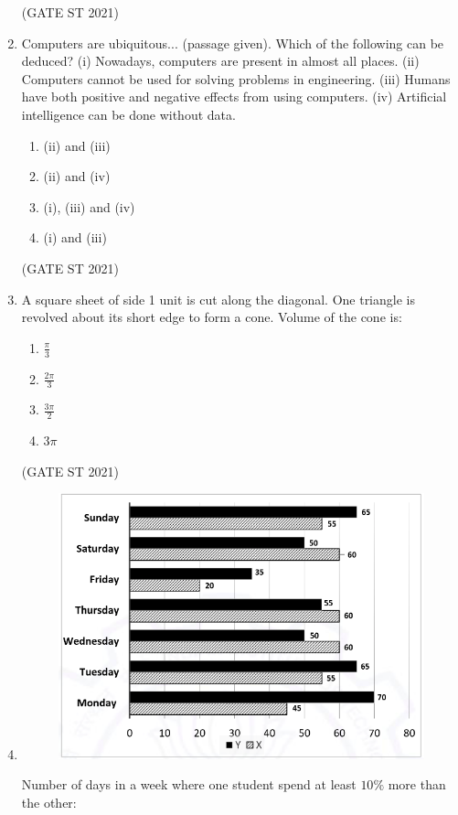 \documentclass[journal,12pt,onecolumn]{IEEEtran}
\theoremstyle{remark}
\begin{document}
\begin{enumerate}
\hfill (GATE ST 2021)\\
\item
Computers are ubiquitous... (passage given).  
Which of the following can be deduced?  
(i) Nowadays, computers are present in almost all places.  
(ii) Computers cannot be used for solving problems in engineering.  
(iii) Humans have both positive and negative effects from using computers.  
(iv) Artificial intelligence can be done without data.

\begin{enumerate}
\item (ii) and (iii)
\item (ii) and (iv)
\item (i), (iii) and (iv)
\item (i) and (iii)
\end{enumerate}

\hfill (GATE ST 2021)\\

\item
A square sheet of side 1 unit is cut along the diagonal.  
One triangle is revolved about its short edge to form a cone.  
Volume of the cone is:

\begin{enumerate}
\item $\frac{\pi}{3}$
\item $\frac{2\pi}{3}$
\item $\frac{3\pi}{2}$
\item $3\pi$
\end{enumerate}
\hfill (GATE ST 2021)\\

\newpage
\item
\begin{figure}
    \centering
    \includegraphics[width=0.5\linewidth]{figs/4.png}
    \caption{}
    \label{fig:2}
\end{figure}

  
Number of days in a week where one student spend at least $10\%$ more than the other:


\end{enumerate}
\end{document}
